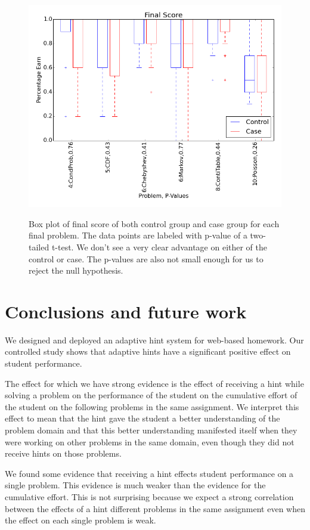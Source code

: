 \documentclass{llncs2e/llncs}
\begin{document}
\begin{figure}
\centering
\caption{Box plot of final score of both control group and case group for each final problem. The data points are labeled with p-value of a two-tailed t-test. We don't see a very clear advantage on either of the control or case. The p-values are also not small enough for us to reject the null hypothesis.}
\includegraphics[width=0.9\linewidth]{image/final_boxPlot.png}
\label{fig:final_compare_all}
\end{figure}
\fi


\section{Conclusions and future work}

We designed and deployed an adaptive hint system for web-based homework. Our controlled study shows that adaptive hints have a significant positive effect on student performance.

The effect for which we have strong evidence is the effect of
receiving a hint while solving a problem on the performance of the
student on the cumulative effort of the student on the following
problems in the same assignment. We interpret this effect to mean that
the hint gave the student a better understanding of the problem domain
and that this better understanding manifested itself when they were
working on other problems in the same domain, even though they did not
receive hints on those problems.

We found some evidence that receiving a hint effects student
performance on a single problem. This evidence is much weaker than the
evidence for the cumulative effort. This is not surprising because we
expect a strong correlation between the effects of a hint different
problems in the same assignment even when the effect on each single
problem is weak.
\end{document}
